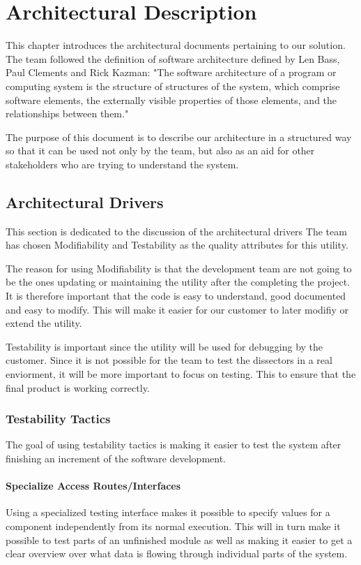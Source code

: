 \chapter{Architectural Description}
This chapter introduces the architectural documents pertaining to our solution. The team followed the definition of software architecture defined by Len Bass, Paul Clements and Rick Kazman: "The software architecture of a program or computing
system is the structure of structures of the system, which comprise software elements, the externally visible properties of those elements, and the relationships between them."\cite{Bass2003}

The purpose of this document is to describe our architecture in a structured way so that it can be used not only by the team, but also as an aid for other stakeholders who are trying to understand the system.


\section{Architectural Drivers}
This section is dedicated to the discussion of the architectural drivers
The team has chosen Modifiability and Testability as the quality attributes for this utility. 

The reason for using Modifiability is that the development team are not going to be the ones updating or maintaining the utility after the completing the project. It is therefore important that the code is easy to understand, good documented and easy to modify. This will make it easier for our customer to later modifiy or extend the utility.

Testability is important since the utility will be used for debugging by the customer.  Since it is not possible for the team to test the dissectors in a real enviorment, it will be more important to focus on testing. This to ensure that the final product is working correctly.

\subsection{Testability Tactics}
The goal of using testability tactics is making it easier to test the system after finishing an increment of the software development. 

\subsubsection{Specialize Access Routes/Interfaces}
Using a specialized testing interface makes it possible to specify values for a component independently from its normal execution. This will in turn make it possible to test parts of an unfinished module as well as making it easier to get a clear overview over what data is flowing through individual parts of the system.

